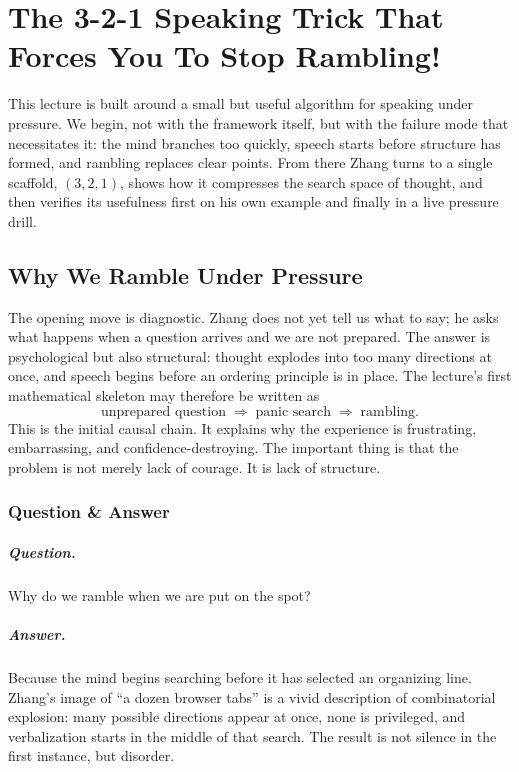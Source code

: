 \chapter{The 3-2-1 Speaking Trick That Forces You To Stop Rambling!}

This lecture is built around a small but useful algorithm for speaking under pressure. We begin, not with the framework itself, but with the failure mode that necessitates it: the mind branches too quickly, speech starts before structure has formed, and rambling replaces clear points. From there Zhang turns to a single scaffold, \((3,2,1)\), shows how it compresses the search space of thought, and then verifies its usefulness first on his own example and finally in a live pressure drill.

\section{Why We Ramble Under Pressure}

The opening move is diagnostic. Zhang does not yet tell us what to say; he asks what happens when a question arrives and we are not prepared. The answer is psychological but also structural: thought explodes into too many directions at once, and speech begins before an ordering principle is in place. The lecture’s first mathematical skeleton may therefore be written as
\begin{equation}
\text{unprepared question}
\;\Rightarrow\;
\text{panic search}
\;\Rightarrow\;
\text{rambling}.
\end{equation}
This is the initial causal chain. It explains why the experience is frustrating, embarrassing, and confidence-destroying. The important thing is that the problem is not merely lack of courage. It is lack of structure.

\subsection{Question \& Answer}

\paragraph{Question.} Why do we ramble when we are put on the spot?

\paragraph{Answer.} Because the mind begins searching before it has selected an organizing line. Zhang’s image of ``a dozen browser tabs'' is a vivid description of combinatorial explosion: many possible directions appear at once, none is privileged, and verbalization starts in the middle of that search. The result is not silence in the first instance, but disorder.

